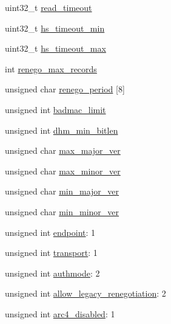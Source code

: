 \begin{DoxyCompactItemize}
\item 
uint32\+\_\+t \mbox{\hyperlink{structmbedtls__ssl__config_a8f32ca22ea20b3848176d78390c13153}{read\+\_\+timeout}}
\item 
uint32\+\_\+t \mbox{\hyperlink{structmbedtls__ssl__config_a28320f7be718c8f4197ee146dfdc2447}{hs\+\_\+timeout\+\_\+min}}
\item 
uint32\+\_\+t \mbox{\hyperlink{structmbedtls__ssl__config_af44d9c59c9255186e2a00f44e0678fac}{hs\+\_\+timeout\+\_\+max}}
\item 
int \mbox{\hyperlink{structmbedtls__ssl__config_a0f2ff6d7f481f9ffaf40025289011a2d}{renego\+\_\+max\+\_\+records}}
\item 
unsigned char \mbox{\hyperlink{structmbedtls__ssl__config_ab1e7273cb7a477f5cb303134055555b0}{renego\+\_\+period}} \mbox{[}8\mbox{]}
\item 
unsigned int \mbox{\hyperlink{structmbedtls__ssl__config_ab61653cfcc80cc9d0d902705212c6e4e}{badmac\+\_\+limit}}
\item 
unsigned int \mbox{\hyperlink{structmbedtls__ssl__config_abba2011a713a2afab2cf724c21f11efb}{dhm\+\_\+min\+\_\+bitlen}}
\item 
unsigned char \mbox{\hyperlink{structmbedtls__ssl__config_a10a7ca31f5096d71fc9effbe004d3fd8}{max\+\_\+major\+\_\+ver}}
\item 
unsigned char \mbox{\hyperlink{structmbedtls__ssl__config_a5cd10b5cbe18392c64fa6831cb222243}{max\+\_\+minor\+\_\+ver}}
\item 
unsigned char \mbox{\hyperlink{structmbedtls__ssl__config_ae349313f286e0e79d21d18fe40fba06f}{min\+\_\+major\+\_\+ver}}
\item 
unsigned char \mbox{\hyperlink{structmbedtls__ssl__config_a61579a80f1aa272cc8d9f7c2786b7b30}{min\+\_\+minor\+\_\+ver}}
\item 
unsigned int \mbox{\hyperlink{structmbedtls__ssl__config_a7ee72d610d141b932141bf8afb3aec2a}{endpoint}}\+: 1
\item 
unsigned int \mbox{\hyperlink{structmbedtls__ssl__config_a63cafd8d131ac7d162406b47bc6565d0}{transport}}\+: 1
\item 
unsigned int \mbox{\hyperlink{structmbedtls__ssl__config_a0d3c2ea8eaf59a5acfcdb6b123148c1f}{authmode}}\+: 2
\item 
unsigned int \mbox{\hyperlink{structmbedtls__ssl__config_afcd4e0685b3fca3c49043bdd6a84490f}{allow\+\_\+legacy\+\_\+renegotiation}}\+: 2
\item 
unsigned int \mbox{\hyperlink{structmbedtls__ssl__config_a7155fd95a3206146ef1374341d008e92}{arc4\+\_\+disabled}}\+: 1

\end{DoxyCompactItemize}
